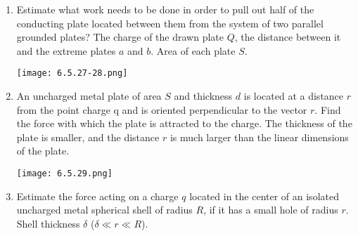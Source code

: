 \documentclass{article}
\begin{document}
\begin{enumerate}[label=6.5.\arabic*]
\item Estimate what work needs to be done in order to pull out half of the conducting plate located between them from the system of two parallel grounded plates? The charge of the drawn plate $Q$, the distance between it and the extreme plates $a$ and $b$. Area of each plate $S$.

\begin{center}
    \texttt{[image: 6.5.27-28.png]}
\end{center}

\item An uncharged metal plate of area $S$ and thickness $d$ is located at a distance $r$ from the point charge q and is oriented perpendicular to the vector $r$. Find the force with which the plate is attracted to the charge. The thickness of the plate is smaller, and the distance $r$ is much larger than the linear dimensions of the plate.

\begin{center}
    \texttt{[image: 6.5.29.png]}
\end{center}

\item Estimate the force acting on a charge $q$ located in the center of an isolated uncharged metal spherical shell of radius $R$, if it has a small hole of radius $r$. Shell thickness $\delta$ ($\delta \ll r \ll R$).




\end{enumerate}
\end{document}
